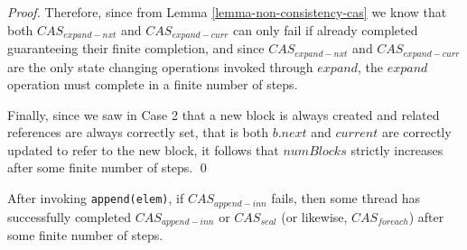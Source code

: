 \documentclass[runningheads,a4paper]{llncs}
\begin{document}
\begin{proof}
Therefore, since from Lemma \ref{lemma-non-consistency-cas} we know that both
$CAS_{expand-nxt}$ and $CAS_{expand-curr}$ can only fail if already completed
guaranteeing their finite completion, and since $CAS_{expand-nxt}$ and 
$CAS_{expand-curr}$ are the only state changing operations invoked through
$expand$, the $expand$ operation must complete in a finite number of steps.

Finally, since we saw in Case 2 that a new block is always created and related
references are always correctly set, that is both $b.next $ and $current$ are
correctly updated to refer to the new block, it follows that $numBlocks$
strictly increases after some finite number of steps.
\qed
\end{proof}



\begin{lemma}\label{lemma-cas2} After invoking \verb=append(elem)=, if
$CAS_{append-inn}$ fails, then some thread has successfully completed 
$CAS_{append-inn}$ or $CAS_{seal}$ (or likewise, $CAS_{foreach}$) after some 
finite number of steps.
\end{lemma}
\end{document}
